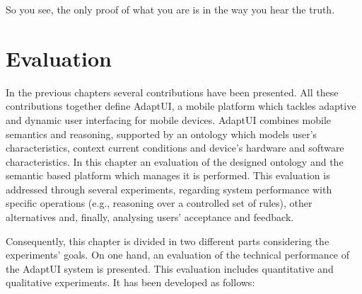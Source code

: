 \begin{savequote}[50mm]
So you see, the only proof of what you are is in the way you hear the truth.
\end{savequote}

\ifpdf
\graphicspath{{5_experiments_and_results/figures/PNG/}
{5_experiments_and_results/figures/PDF/}{5_experiments_and_results/figures/}}
\fi

\chapter{Evaluation}
\label{cha:evaluation}


In the previous chapters several contributions have been presented. All these
contributions together define AdaptUI, a mobile platform which tackles adaptive 
and dynamic user interfacing for mobile devices. AdaptUI combines mobile 
semantics and reasoning, supported by an ontology which models user's 
characteristics, context current conditions and device's hardware and software 
characteristics. In this chapter an evaluation of the designed ontology and the 
semantic based platform which manages it is performed. This evaluation is 
addressed through several experiments, regarding system performance with specific 
operations (e.g., reasoning over a controlled set of rules), other alternatives 
and, finally, analysing users' acceptance and feedback.

Consequently, this chapter is divided in two different parts considering the 
experiments' goals. On one hand, an evaluation of the technical performance
of the AdaptUI system is presented. This evaluation includes quantitative and 
qualitative experiments. It has been developed as follows:

